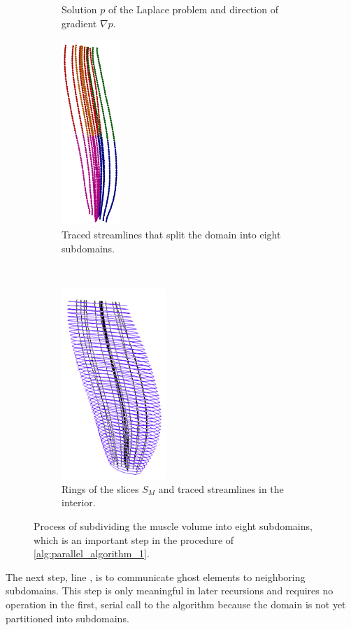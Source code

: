 \begin{figure}
\begin{subfigure}[t]{0.24\textwidth}
    \caption{Solution $p$ of the Laplace problem and direction of gradient $\nabla p$.}%
    \label{fig:laplace_1}%
  \end{subfigure}
  \qquad
  \begin{subfigure}[t]{0.19\textwidth}%
    \centering%
    \includegraphics[height=7cm]{images/parallel_fiber_estimation/border_points_1.png}
    \caption{Traced streamlines that split the domain into eight subdomains.}%
    \label{fig:border_points_1}%
  \end{subfigure}
  \,
  \begin{subfigure}[t]{0.24\textwidth}%
    \centering%
    \includegraphics[height=7.2cm]{images/parallel_fiber_estimation/slices_2.png}
    \caption{Rings of the slices $S_M$ and traced streamlines in the interior.}%
    \label{fig:slices_2}%
  \end{subfigure}
  \caption{Process of subdividing the muscle volume into eight subdomains, which is an important step in the procedure of \cref{alg:parallel_algorithm_1}.}
  \label{fig:determining_subdomains}%
\end{figure}

The next step, line , is to communicate ghost elements to neighboring subdomains. This step is only meaningful in later recursions and requires no operation in the first, serial call to the algorithm because the domain is not yet partitioned into subdomains.

